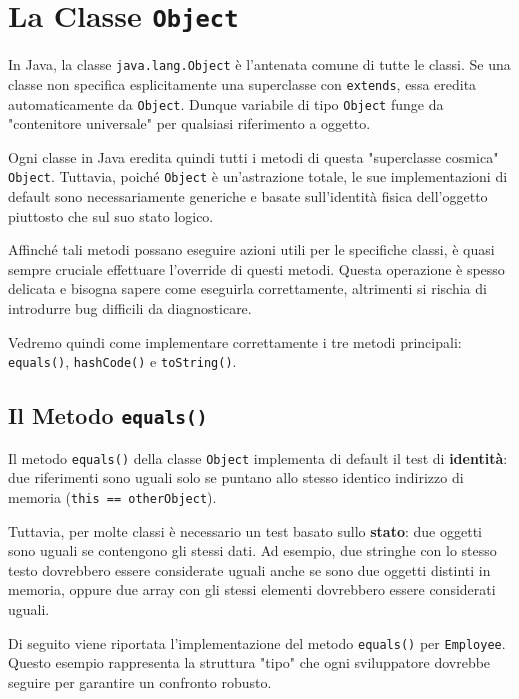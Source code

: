\section{La Classe \texttt{Object}}

In Java, la classe \texttt{java.lang.Object} è l'antenata comune di tutte le classi. Se una classe non specifica esplicitamente una superclasse con \texttt{extends}, essa eredita automaticamente da \texttt{Object}. Dunque variabile di tipo \texttt{Object} funge da "contenitore universale" per qualsiasi riferimento a oggetto.

Ogni classe in Java eredita quindi tutti i metodi di questa "superclasse cosmica" \texttt{Object}. Tuttavia, poiché \texttt{Object} è un'astrazione totale, le sue implementazioni di default sono necessariamente generiche e basate sull'identità fisica dell'oggetto piuttosto che sul suo stato logico.

Affinché tali metodi possano eseguire azioni utili per le specifiche classi, è quasi sempre cruciale effettuare l'override di questi metodi. Questa operazione è spesso delicata e bisogna sapere come eseguirla correttamente, altrimenti si rischia di introdurre bug difficili da diagnosticare.

Vedremo quindi come implementare correttamente i tre metodi principali: \texttt{equals()}, \texttt{hashCode()} e \texttt{toString()}.

\subsection{Il Metodo \texttt{equals()}}

Il metodo \texttt{equals()} della classe \texttt{Object} implementa di default il test di \textbf{identità}: due riferimenti sono uguali solo se puntano allo stesso identico indirizzo di memoria (\texttt{this == otherObject}).

Tuttavia, per molte classi è necessario un test basato sullo \textbf{stato}: due oggetti sono uguali se contengono gli stessi dati. Ad esempio, due stringhe con lo stesso testo dovrebbero essere considerate uguali anche se sono due oggetti distinti in memoria, oppure due array con gli stessi elementi dovrebbero essere considerati uguali.

Di seguito viene riportata l'implementazione del metodo \texttt{equals()} per \texttt{Employee}. Questo esempio rappresenta la struttura "tipo" che ogni sviluppatore dovrebbe seguire per garantire un confronto robusto.

